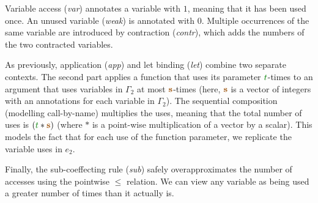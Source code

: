 Variable access (\emph{var}) annotates a variable with $1$, meaning that it has been used once. An
unused variable (\emph{weak}) is annotated with $0$. Multiple occurrences of the same variable are 
introduced by contraction (\emph{contr}), which adds the numbers of the two contracted variables.

As previously, application (\emph{app}) and let binding (\emph{let}) combine two separate contexts.
The second part applies a function that uses its parameter $\cclrd{t}$-times to an argument that uses
variables in $\Gamma_2$ at most $\aclrd{\mathbf{s}}$-times (here, $\aclrd{\mathbf{s}}$ is a vector of
integers with an annotations for each variable in $\Gamma_2$). The sequential composition (modelling
call-by-name) multiplies the uses, meaning that the total number of uses is $(\cclrd{t} \ast \aclrd{\mathbf{s}})$
(where $\ast$ is a point-wise multiplication of a vector by a scalar). This models the fact that 
for each use of the function parameter, we replicate the variable uses in $e_2$.

Finally, the sub-coeffecting rule (\emph{sub}) safely overapproximates the number of accesses using 
the pointwise $\leq$ relation. We can view any variable as being used a greater
number of times than it actually is.


